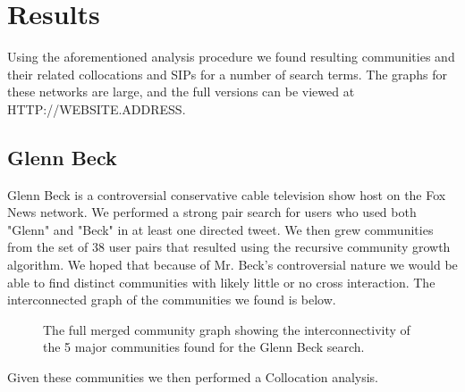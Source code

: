 \section{Results}
Using the aforementioned analysis procedure we found resulting communities and their related collocations and SIPs for a number of search terms.  The graphs for these networks are large, and the full versions can be viewed at HTTP://WEBSITE.ADDRESS.\\
\subsection{Glenn Beck}
Glenn Beck is a controversial conservative cable television show host on the Fox News network.  We performed a strong pair search for users who used both "Glenn" and "Beck" in at least one directed tweet.  We then grew communities from the set of 38 user pairs that resulted using the recursive community growth algorithm.  We hoped that because of Mr. Beck's controversial nature we would be able to find distinct communities with likely little or no cross interaction.  The interconnected graph of the communities we found is below.\\
\begin{figure}
  \begin{center}
  \end{center}
  \caption{The full merged community graph showing the interconnectivity of the 5 major communities found for the Glenn Beck search.}
  \label{gbGraph}
\end{figure}
Given these communities we then performed a Collocation analysis.\\